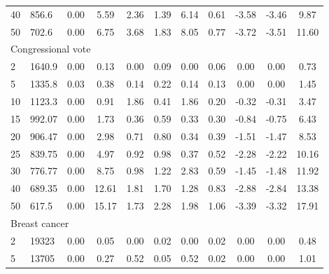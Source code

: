 {\begin{longtable}{@{}llccccccccc@{}}
40 & 856.6      & 0.00         & 5.59         & 2.36        & 1.39       & 6.14        & 0.61      & -3.58     & -3.46     & 9.87  \\
50 & 702.6      & 0.00         & 6.75         & 3.68        & 1.83       & 8.05        & 0.77      & -3.72     & -3.51     & 11.60 \\
\multicolumn{11}{l}{Congressional vote}                                                                                            \\
2  & 1640.9     & 0.00         & 0.13         & 0.00        & 0.09       & 0.00        & 0.06      & 0.00      & 0.00      & 0.73  \\
5  & 1335.8     & 0.03         & 0.38         & 0.14        & 0.22       & 0.14        & 0.13      & 0.00      & 0.00      & 1.45  \\
10 & 1123.3     & 0.00         & 0.91         & 1.86        & 0.41       & 1.86        & 0.20      & -0.32     & -0.31     & 3.47  \\
15 & 992.07     & 0.00         & 1.73         & 0.36        & 0.59       & 0.33        & 0.30      & -0.84     & -0.75     & 6.43  \\
20 & 906.47     & 0.00         & 2.98         & 0.71        & 0.80       & 0.34        & 0.39      & -1.51     & -1.47     & 8.53  \\
25 & 839.75     & 0.00         & 4.97         & 0.92        & 0.98       & 0.37        & 0.52      & -2.28     & -2.22     & 10.16 \\
30 & 776.77     & 0.00         & 8.75         & 0.98        & 1.22       & 2.83        & 0.59      & -1.45     & -1.48     & 11.92 \\
40 & 689.35     & 0.00         & 12.61        & 1.81        & 1.70       & 1.28        & 0.83      & -2.88     & -2.84     & 13.38 \\
50 & 617.5      & 0.00         & 15.17        & 1.73        & 2.28       & 1.98        & 1.06      & -3.39     & -3.32     & 17.91 \\
\multicolumn{11}{l}{Breast cancer}                                                                                                 \\
2  & 19323      & 0.00         & 0.05         & 0.00        & 0.02       & 0.00        & 0.02      & 0.00      & 0.00      & 0.48  \\
5  & 13705      & 0.00         & 0.27         & 0.52        & 0.05       & 0.52        & 0.02      & 0.00      & 0.00      & 1.01  \\

\end{longtable}}

